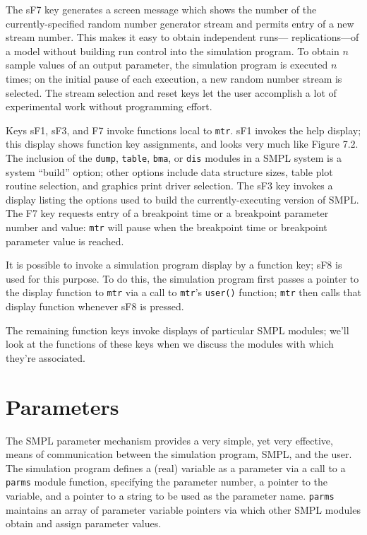 The sF7 key generates a screen message which shows the number of the
currently-specified random number generator stream and permits entry of a
new stream number. This makes it easy to obtain independent runs---
replications---of a model without building run control into the simulation
program. To obtain $n$ sample values of an output parameter, the simulation
program is executed $n$ times; on the initial pause of each execution, a new
random number stream is selected. The stream selection and reset keys let
the user accomplish a lot of experimental work without programming effort.

Keys sF1, sF3, and F7 invoke functions local to \texttt{mtr}. sF1 invokes the help
display; this display shows function key assignments, and looks very much
like Figure 7.2. The inclusion of the \texttt{dump}, \texttt{table}, \texttt{bma}, or \texttt{dis} modules in a
SMPL system is a system ``build'' option; other options include data structure
sizes, table plot routine selection, and graphics print driver selection. The
sF3 key invokes a display listing the options used to build the currently-executing
version of SMPL. The F7 key requests entry of a breakpoint time or
a breakpoint parameter number and value: \texttt{mtr} will pause when the breakpoint
time or breakpoint parameter value is reached.

It is possible to invoke a simulation program display by a function key;
sF8 is used for this purpose. To do this, the simulation program first passes a
pointer to the display function to \texttt{mtr} via a call to \texttt{mtr}'s \texttt{user()} function; \texttt{mtr}
then calls that display function whenever sF8 is pressed.


The remaining function keys invoke displays of particular SMPL modules;
we'll look at the functions of these keys when we discuss the modules
with which they're associated.

\section{Parameters}
\label{sec:simenv-parameters}

The SMPL parameter mechanism provides a very simple, yet very
effective, means of communication between the simulation program, SMPL,
and the user. The simulation program defines a (real) variable as a
parameter via a call to a \texttt{parms} module function, specifying the parameter
number, a pointer to the variable, and a pointer to a string to be used as the
parameter name. \texttt{parms} maintains an array of parameter variable pointers
via which other SMPL modules obtain and assign parameter values.

